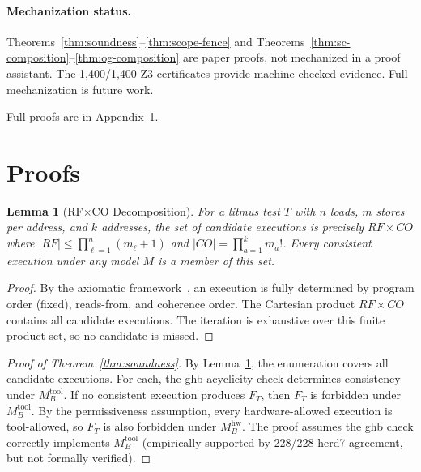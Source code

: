 \documentclass[11pt]{article}
\newtheorem{lemma}[theorem]{Lemma}
\begin{document}
\paragraph{Mechanization status.}
Theorems~\ref{thm:soundness}--\ref{thm:scope-fence} and
Theorems~\ref{thm:sc-composition}--\ref{thm:og-composition} are paper proofs,
not mechanized in a proof assistant. The 1{,}400/1{,}400 Z3 certificates
provide machine-checked evidence. Full mechanization is future work.

Full proofs are in Appendix~\ref{app:proofs}.

\section{Proofs}
\label{app:proofs}

\begin{lemma}[RF$\times$CO Decomposition]
\label{lem:rfco}
For a litmus test $T$ with $n$ loads, $m$ stores per address, and
$k$ addresses, the set of candidate executions is precisely
$\mathit{RF} \times \mathit{CO}$ where $|\mathit{RF}| \leq
\prod_{\ell=1}^{n}(m_\ell+1)$ and
$|\mathit{CO}| = \prod_{a=1}^{k} m_a!$.
Every consistent execution under any model $M$ is a member of this set.
\end{lemma}

\begin{proof}
By the axiomatic framework~\cite{Alglave2014}, an execution is
fully determined by program order (fixed), reads-from, and coherence order.
The Cartesian product $\mathit{RF} \times \mathit{CO}$ contains all
candidate executions. The iteration is exhaustive over this
finite product set, so no candidate is missed.
\end{proof}

\begin{proof}[Proof of Theorem~\ref{thm:soundness}]
By Lemma~\ref{lem:rfco}, the enumeration covers all candidate executions.
For each, the ghb acyclicity check determines consistency under
$M_B^{\mathrm{tool}}$. If no consistent execution produces $F_T$,
then $F_T$ is forbidden under $M_B^{\mathrm{tool}}$.
By the permissiveness assumption, every hardware-allowed execution is
tool-allowed, so $F_T$ is also forbidden under $M_B^{\mathrm{hw}}$.
The proof assumes the ghb check correctly implements $M_B^{\mathrm{tool}}$
(empirically supported by 228/228 herd7 agreement, but not formally verified).
\end{proof}
\end{document}
